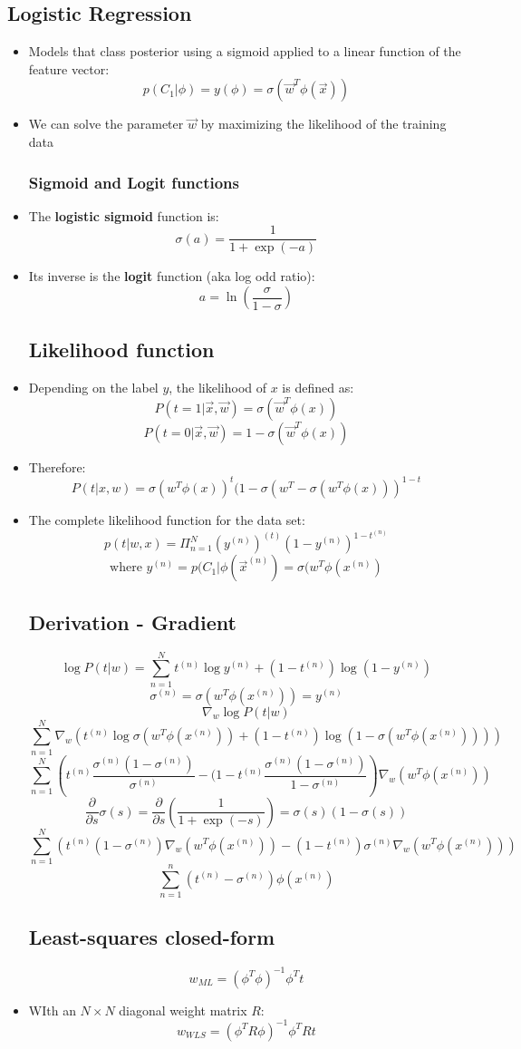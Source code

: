 \subsection{Logistic Regression}
\begin{itemize}
	\item Models that class posterior using a sigmoid applied to a linear function of the feature vector:
		$$p(C_1|\phi)=y(\phi ) = \sigma (\vec{w}^T \phi (\vec{x}))$$
	\item We can solve the parameter $\vec{w}$ by maximizing the likelihood of the training data
	\subsubsection{Sigmoid and Logit functions}
	\item The \textbf{logistic sigmoid} function is:
		$$\sigma (a)=\frac{1}{1+\exp (-a)}$$
	\item Its inverse is the \textbf{logit} function (aka log odd ratio):
		$$a=\ln \left( \frac{\sigma}{1-\sigma}\right)$$
	\subsection{Likelihood function}
	\item Depending on the label $y$, the likelihood of $x$ is defined as:
		$$P(t=1|\vec{x}, \vec{w}) = \sigma(\vec{w}^T\phi(x))$$
		$$P(t=0|\vec{x}, \vec{w}) = 1-\sigma(\vec{w}^T\phi(x))$$
	\item Therefore:
		$$P(t|x, w)=\sigma(w^T\phi(x))^t (1-\sigma(w^T - \sigma (w^T\phi(x)))^{1-t}$$
	\item The complete likelihood function for the data set:
		$$p(t|w, x)=\Pi_{n=1}^N (y^{(n)})^{(t)}(1-y^{(n)})^{1-t^{(n)}}$$
		$$\text{where }y^{(n)}=p(C_1 | \phi(\vec{x}^{(n)})=\sigma (w^T \phi(x^{(n)})$$
	\subsection{Derivation - Gradient}
	$$\log P(t|w)=\sum_{n=1}^N t^{(n)}\log y^{(n)} + (1-t^{(n)})\log(1-y^{(n)})$$
	$$\sigma^{(n)}=\sigma(w^T\phi(x^{(n)}))=y^{(n)}$$
	$$\nabla_w\log P(t|w)$$
	$$\sum_{n=1}^N \nabla_w \left( t^{(n)}\log\sigma(w^T\phi(x^{(n)}))+(1-t^{(n)})\log(1-\sigma(w^T\phi(x^{(n)})))\right)$$
	$$\sum_{n=1}^N \left( t^{(n)}\frac{\sigma^{(n)}(1-\sigma^{(n)})}{\sigma^{(n)}}-(1-t^{(n)}\frac{\sigma^{(n)}(1-\sigma^{(n)})}{1-\sigma^{(n)}}\right) \nabla_w (w^T\phi(x^{(n)}))$$
	$$\frac{\partial}{\partial s}\sigma(s)=\frac{\partial}{\partial s}\left( \frac{1}{1+\exp(-s)}\right)=\sigma(s)(1-\sigma(s))$$
	$$\sum_{n=1}^N \left( t^{(n)}(1-\sigma^{(n)})\nabla_w (w^T\phi(x^{(n)})) - (1-t^{(n)})\sigma^{(n)}\nabla_w (w^T\phi(x^{(n)})) \right)$$
	$$\sum_{n=1}^n (t^{(n)} - \sigma^{(n)})\phi(x^{(n)})$$
	\subsection{Least-squares closed-form}
		$$w_{ML}=(\phi^T \phi)^{-1}\phi^T t$$
	\item WIth an $N\times N$ diagonal weight matrix $R$:
		$$w_{WLS}=(\phi^T R\phi)^{-1}\phi^T R t$$
\end{itemize}

